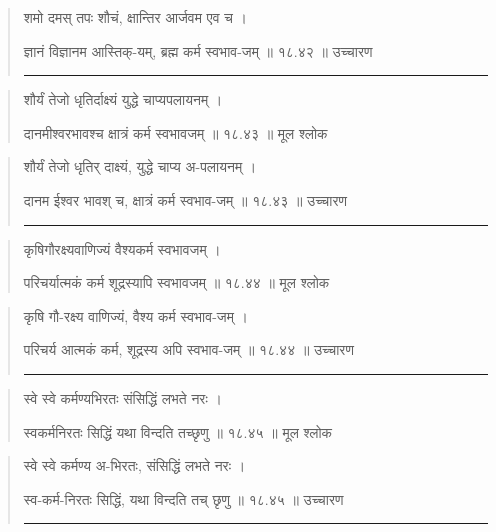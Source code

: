 \begin{quotation}

शमो दमस् तपः शौचं, क्षान्तिर आर्जवम एव च ।  

ज्ञानं विज्ञानम आस्तिक्-यम्, ब्रह्म कर्म स्वभाव-जम्‌  ॥ १८.४२ ॥  उच्चारण

\noindent\rule{16cm}{0.4pt} 
\end{quotation}


\begin{quotation}

शौर्यं तेजो धृतिर्दाक्ष्यं युद्धे चाप्यपलायनम्‌ ।  

दानमीश्वरभावश्च क्षात्रं कर्म स्वभावजम्‌  ॥ १८.४३ ॥  मूल श्लोक
\end{quotation}

\begin{quotation}

शौर्यं तेजो धृतिर् दाक्ष्यं, युद्धे चाप्य अ-पलायनम्‌ ।  

दानम ईश्वर भावश् च, क्षात्रं कर्म स्वभाव-जम्‌  ॥ १८.४३ ॥  उच्चारण

\noindent\rule{16cm}{0.4pt} 
\end{quotation}


\begin{quotation}

कृषिगौरक्ष्यवाणिज्यं वैश्यकर्म स्वभावजम्‌ ।  

परिचर्यात्मकं कर्म शूद्रस्यापि स्वभावजम्‌  ॥ १८.४४ ॥  मूल श्लोक
\end{quotation}

\begin{quotation}

कृषि गौ-रक्ष्य वाणिज्यं, वैश्य कर्म स्वभाव-जम्‌ ।  

परिचर्य आत्मकं कर्म, शूद्रस्य अपि स्वभाव-जम्‌  ॥ १८.४४ ॥  उच्चारण

\noindent\rule{16cm}{0.4pt} 
\end{quotation}


\begin{quotation}

स्वे स्वे कर्मण्यभिरतः संसिद्धिं लभते नरः ।  

स्वकर्मनिरतः सिद्धिं यथा विन्दति तच्छृणु  ॥ १८.४५ ॥  मूल श्लोक
\end{quotation}

\begin{quotation}

स्वे स्वे कर्मण्य अ-भिरतः, संसिद्धिं लभते नरः ।  

स्व-कर्म-निरतः सिद्धिं, यथा विन्दति तच् छृणु  ॥ १८.४५ ॥  उच्चारण

\noindent\rule{16cm}{0.4pt} 
\end{quotation}


